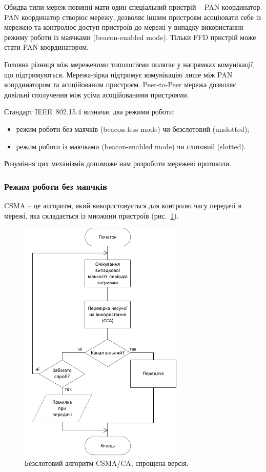 \documentclass[a4paper,ukrainian,utf8,nocolumnsxix,floatsection]{eskdtext}
\renewcommand\paragraph{\subsubsection}
\newcommand{\figref}[1]{рис.~\ref{#1}}
\newcommand{\iee}[0]{IEEE~802.15.4\xspace}
\newcommand{\csma}[0]{CSMA/CA\xspace}
\begin{document}
Обидва типи мереж повинні мати один спеціальний пристрій – PAN координатор. PAN координатор створює мережу, дозволяє іншим пристроям асоціювати себе із мережею та контролює доступ пристроїв до мережі у випадку використання режиму роботи із маячками (beacon-enabled mode). Тільки FFD пристрій може стати PAN координатором.

Головна різниця між мережевими топологіями полягає у напрямках комунікації, що підтримуються. Мережа-зірка підтримує комунікацію лише між PAN координатором та асоційованим пристроєм. Peer-to-Peer мережа дозволяє довільні сполучення між усіма асоційованими пристроями.

Стандарт \iee визначає два режими роботи:
\begin{itemize}
	\item режим роботи без маячків (beacon-less mode) чи безслотовий (unslotted);
	\item режим роботи із маячками (beacon-enabled mode) чи слотовий (slotted).
\end{itemize}

Розуміння цих механізмів допоможе нам розробити мережеві протоколи.


\paragraph{Режим роботи без маячків}

CSMA – це алгоритм, який використовується для контролю часу передачі в мережі, яка складається із множини пристроїв (\figref{fig:csma-ca}).

\begin{figure}[bth]
	\centering
	\includegraphics[width=0.7\textwidth]{img/csma-ca.pdf}
	\caption{\label{fig:csma-ca}Безслотовий алгоритм \csma, спрощена версія.}
\end{figure}
\end{document}
